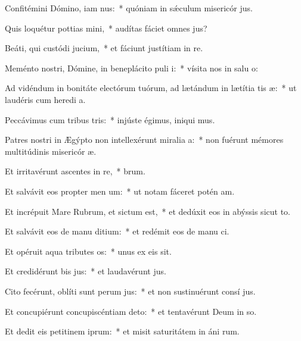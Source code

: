 \item Confitémini Dómino, iam nus:~* quóniam in sǽculum misericór jus.
\item Quis loquétur pottias mini,~* audítas fáciet omnes  jus?
\item Beáti, qui custódi jucium,~* et fáciunt justítiam in  re.
\item Meménto nostri, Dómine, in beneplácito puli i:~* vísita nos in salu o:
\item Ad vidéndum in bonitáte electórum tuórum, ad lætándum in lætítia tis æ:~* ut laudéris cum heredi a.
\item Peccávimus cum tribus tris:~* injúste égimus, iniqui mus.
\item Patres nostri in Ægýpto non intellexérunt miralia a:~* non fuérunt mémores multitúdinis misericór æ.
\item Et irritavérunt ascentes in re,~*  brum.
\item Et salvávit eos propter men um:~* ut notam fáceret potén am.
\item Et incrépuit Mare Rubrum, et sictum est,~* et dedúxit eos in abýssis sicut  to.
\item Et salvávit eos de manu ditium:~* et redémit eos de manu ci.
\item Et opéruit aqua tributes os:~* unus ex eis  sit.
\item Et credidérunt bis jus:~* et laudavérunt  jus.
\item Cito fecérunt, oblíti sunt perum jus:~* et non sustinuérunt consí jus.
\item Et concupiérunt concupiscéntiam  deto:~* et tentavérunt Deum in so.
\item Et dedit eis petitinem iprum:~* et misit saturitátem in áni rum.
